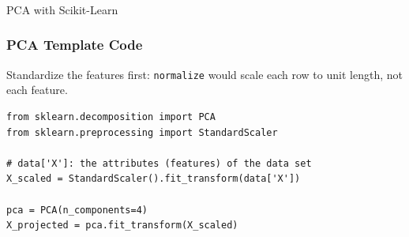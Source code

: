 \begin{frame}[fragile]\frametitle{}
\begin{center}
{\Large PCA with Scikit-Learn}
\end{center}
\end{frame}

\begin{frame}[fragile]
\frametitle{PCA Template Code}
Standardize the features first: \texttt{normalize} would scale each row to unit length, not each feature.
\begin{lstlisting}
from sklearn.decomposition import PCA
from sklearn.preprocessing import StandardScaler

# data['X']: the attributes (features) of the data set
X_scaled = StandardScaler().fit_transform(data['X'])

pca = PCA(n_components=4)
X_projected = pca.fit_transform(X_scaled)
\end{lstlisting}
\end{frame}












